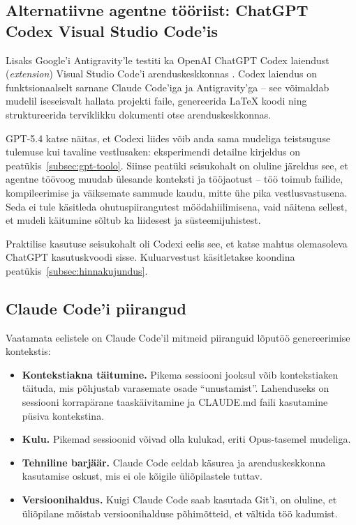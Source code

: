 \subsection{Alternatiivne agentne tööriist: ChatGPT Codex Visual Studio Code'is} \label{subsec:codex}

Lisaks Google'i Antigravity'le testiti ka OpenAI ChatGPT Codex laiendust (\textit{extension}) Visual Studio Code'i arenduskeskkonnas \cite{openai2025codex}. Codex laiendus on funktsionaalselt sarnane Claude Code'iga ja Antigravity'ga -- see võimaldab mudelil iseseisvalt hallata projekti faile, genereerida \LaTeX{} koodi ning struktureerida terviklikku dokumenti otse arenduskeskkonnas.

GPT-5.4 katse näitas, et Codexi liides võib anda sama mudeliga teistsuguse tulemuse kui tavaline vestlusaken: eksperimendi detailne kirjeldus on peatükis~\ref{subsec:gpt-toolo}. Siinse peatüki seisukohalt on oluline järeldus see, et agentne töövoog muudab ülesande konteksti ja tööjaotust -- töö toimub failide, kompileerimise ja väiksemate sammude kaudu, mitte ühe pika vestlusvastusena. Seda ei tule käsitleda ohutuspiirangutest möödahiilimisena, vaid näitena sellest, et mudeli käitumine sõltub ka liidesest ja süsteemijuhistest.

Praktilise kasutuse seisukohalt oli Codexi eelis see, et katse mahtus olemasoleva ChatGPT kasutuskvoodi sisse. Kuluarvestust käsitletakse koondina peatükis~\ref{subsec:hinnakujundus}.

\subsection{Claude Code'i piirangud} \label{subsec:claudecode-piirangud}

Vaatamata eelistele on Claude Code'il mitmeid piiranguid lõputöö genereerimise kontekstis:

\begin{itemize}
    \item \textbf{Kontekstiakna täitumine.} Pikema sessiooni jooksul võib kontekstiaken täituda, mis põhjustab varasemate osade ``unustamist''. Lahenduseks on sessiooni korrapärane taaskäivitamine ja CLAUDE.md faili kasutamine püsiva kontekstina.
    \item \textbf{Kulu.} Pikemad sessioonid võivad olla kulukad, eriti Opus-tasemel mudeliga.
    \item \textbf{Tehniline barjäär.} Claude Code eeldab käsurea ja arenduskeskkonna kasutamise oskust, mis ei ole kõigile üliõpilastele tuttav.
    \item \textbf{Versioonihaldus.} Kuigi Claude Code saab kasutada Git'i, on oluline, et üliõpilane mõistab versioonihalduse põhimõtteid, et vältida töö kadumist.
\end{itemize}

